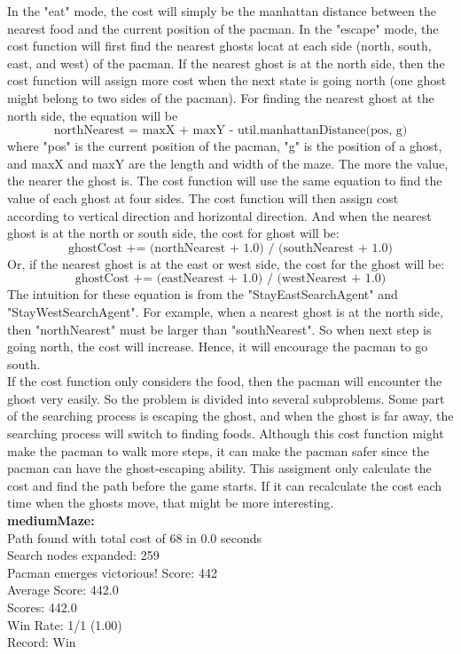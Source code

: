 \documentclass[11pt]{article}
\begin{document}
\noindent
In the "eat" mode, the cost will simply be the manhattan distance between the nearest food and the current position of the pacman. In the "escape" mode, the cost function will first find the nearest ghosts locat at each side (north, south, east, and west) of the pacman. If the nearest ghost is at the north side, then the cost function will assign more cost when the next state is going north (one ghost might belong to two sides of the pacman). For finding the nearest ghost at the north side, the equation will be 
$$\text{northNearest = maxX + maxY - util.manhattanDistance(pos, g)}$$
where "pos" is the current position of the pacman, "g" is the position of a ghost, and maxX and maxY are the length and width of the maze. The more the value, the nearer the ghost is. The cost function will use the same equation to find the value of each ghost at four sides. The cost function will then assign cost according to vertical direction and horizontal direction. And when the nearest ghost is at the north or south side, the cost for ghost will be:
$$\text{ghostCost += (northNearest + 1.0) / (southNearest + 1.0)}$$
Or, if the nearest ghost is at the east or west side, the cost for the ghost will be:
$$\text{ghostCost += (eastNearest + 1.0) / (westNearest + 1.0)}$$
The intuition for these equation is from the "StayEastSearchAgent" and "StayWestSearchAgent". For example, when a nearest ghost is at the north side, then "northNearest" must be larger than "southNearest". So when next step is going north, the cost will increase. Hence, it will encourage the pacman to go south.\\

\noindent
If the cost function only considers the food, then the pacman will encounter the ghost very easily. So the problem is divided into several subproblems. Some part of the searching process is escaping the ghost, and when the ghost is far away, the searching process will switch to finding foods. Although this cost function might make the pacman to walk more steps, it can make the pacman safer since the pacman can have the ghost-escaping ability. This assigment only calculate the cost and find the path before the game starts. If it can recalculate the cost each time when the ghosts move, that might be more interesting.\\

\noindent
\textbf{mediumMaze:}\\
Path found with total cost of 68 in 0.0 seconds\\
Search nodes expanded: 259\\
Pacman emerges victorious! Score: 442\\
Average Score: 442.0\\
Scores:        442.0\\
Win Rate:      1/1 (1.00)\\
Record:        Win\\
\end{document}
